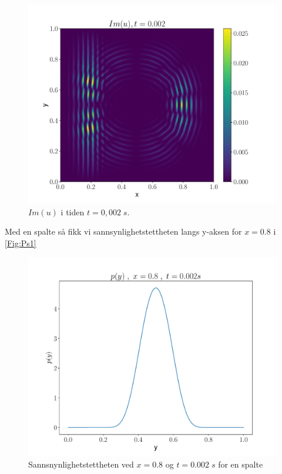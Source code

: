 \documentclass[reprint,english,notitlepage]{revtex4-2}  %
\begin{document}
\begin{figure}[H]
\centering
\includegraphics[scale=0.45, trim={3cm 0 0 0}]{../Images/ImshowIm0002sl2.pdf}
\caption{$Im(u) $ i tiden $t = 0,002 \; s$.}
\label{Fig:s2Imt02}
\end{figure}

Med en spalte så fikk vi sannsynlighetstettheten langs y-aksen for $x = 0.8$ i \autoref{Fig:Ps1}

\begin{figure}[H]
\centering
\includegraphics[scale=0.4]{../Images/ScreenProb1Slit.pdf}
\caption{Sannsnynlighetstettheten ved $x = 0.8$ og $t = 0.002 \; s$ for en spalte}
\label{Fig:Ps1}
\end{figure}
\end{document}
